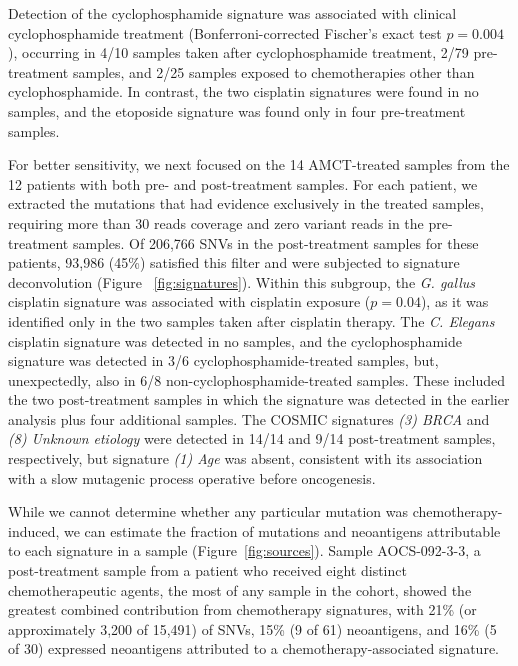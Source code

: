 Detection of the cyclophosphamide signature was associated with clinical cyclophosphamide treatment (Bonferroni-corrected Fischer's exact test $p = 0.004$), occurring in 4/10 samples taken after cyclophosphamide treatment, 2/79 pre-treatment samples, and 2/25 samples exposed to chemotherapies other than cyclophosphamide. In contrast, the two cisplatin signatures were found in no samples, and the etoposide signature was found only in four pre-treatment samples.


For better sensitivity, we next focused on the 14 AMCT-treated samples from the 12 patients with both pre- and post-treatment samples. For each patient, we extracted the mutations that had evidence exclusively in the treated samples, requiring more than 30 reads coverage and zero variant reads in the pre-treatment samples. Of 206,766 SNVs in the post-treatment samples for these patients, 93,986 (45\%) satisfied this filter and were subjected to signature deconvolution (Figure ~\ref{fig:signatures}). Within this subgroup, the \textit{G. gallus} cisplatin signature was associated with cisplatin exposure ($p = 0.04$), as it was identified only in the two samples taken after cisplatin therapy. The \textit{C. Elegans} cisplatin signature was detected in no samples, and the cyclophosphamide signature was detected in 3/6 cyclophosphamide-treated samples, but, unexpectedly, also in 6/8 non-cyclophosphamide-treated samples. These included the two post-treatment samples in which the signature was detected in the earlier analysis plus four additional samples. The COSMIC signatures \textit{(3) BRCA} and \textit{(8) Unknown etiology} were detected in 14/14 and 9/14 post-treatment samples, respectively, but signature \textit{(1) Age} was absent, consistent with its association with a slow mutagenic process operative before oncogenesis.

While we cannot determine whether any particular mutation was chemotherapy-induced, we can estimate the fraction of mutations and neoantigens attributable to each signature in a sample (Figure~\ref{fig:sources}). Sample AOCS-092-3-3, a post-treatment sample from a patient who received eight distinct chemotherapeutic agents, the most of any sample in the cohort, showed the greatest combined contribution from chemotherapy signatures, with 21\% (or approximately 3,200 of 15,491) of SNVs, 15\% (9 of 61) neoantigens, and 16\% (5 of 30) expressed neoantigens attributed to a chemotherapy-associated signature.

